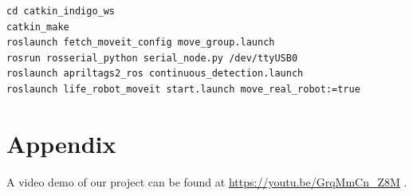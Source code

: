 \documentclass[12pt,draftclsnofoot,onecolumn]{IEEEtran}
\begin{document}
\lstset{language=c}
\begin{lstlisting}
cd catkin_indigo_ws
catkin_make
roslaunch fetch_moveit_config move_group.launch
rosrun rosserial_python serial_node.py /dev/ttyUSB0
roslaunch apriltags2_ros continuous_detection.launch
roslaunch life_robot_moveit start.launch move_real_robot:=true
\end{lstlisting}


	\section{Appendix}
	
	A video demo of our project can be found at \href{https://youtu.be/GrqMmCn_Z8M}{https://youtu.be/GrqMmCn\_Z8M} .
	
	
	
	
	
	
	
	
\end{document}
